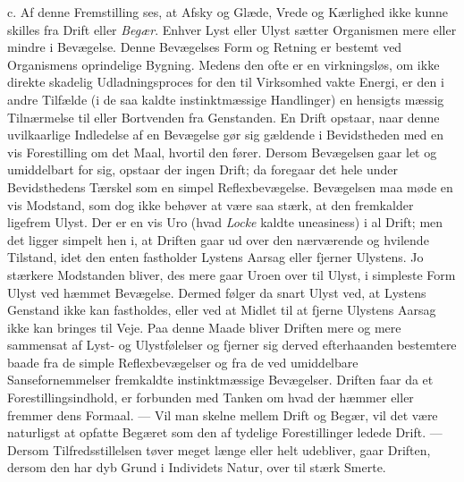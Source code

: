 \documentclass[12pt,a4paper,openany]{book}
\newcommand{\opage}[1]{\marginnote{\footnotesize\textit{[#1]}}}
\begin{document}
c. Af denne Fremstilling ses, at Afsky og Glæde, Vrede og Kærlighed ikke
kunne skilles fra Drift eller \emph{Begær}. Enhver Lyst eller Ulyst
sætter Organismen mere eller mindre i Bevægelse. Denne Bevægelses Form
og Retning er bestemt ved Organismens oprindelige Bygning. Medens den
ofte er en virkningsløs, om ikke direkte skadelig Udladningsproces for
den til Virksomhed vakte Energi, er den i andre Tilfælde (i de saa
kaldte instinktmæssige Handlinger) en hensigts%
\opage{284}mæssig Tilnærmelse til eller Bortvenden fra Genstanden. En
Drift opstaar, naar denne uvilkaarlige Indledelse af en Bevægelse gør
sig gældende i Bevidstheden med en vis Forestilling om det Maal, hvortil
den fører. Dersom Bevægelsen gaar let og umiddelbart for sig, opstaar
der ingen Drift; da foregaar det hele under Bevidsthedens Tærskel som en
simpel Reflexbevægelse. Bevægelsen maa møde en vis Modstand, som dog
ikke behøver at være saa stærk, at den fremkalder ligefrem Ulyst. Der er
en vis Uro (hvad \emph{Locke} kaldte uneasiness) i al Drift; men det
ligger simpelt hen i, at Driften gaar ud over den nærværende og hvilende
Tilstand, idet den enten fastholder Lystens Aarsag eller fjerner
Ulystens. Jo stærkere Modstanden bliver, des mere gaar Uroen over til
Ulyst, i simpleste Form Ulyst ved hæmmet Bevægelse. Dermed følger da
snart Ulyst ved, at Lystens Genstand ikke kan fastholdes, eller ved at
Midlet til at fjerne Ulystens Aarsag ikke kan bringes til Veje. Paa
denne Maade bliver Driften mere og mere sammensat af Lyst- og
Ulystfølelser og fjerner sig derved efterhaanden bestemtere baade fra de
simple Reflexbevægelser og fra de ved umiddelbare Sansefornemmelser
fremkaldte instinktmæssige Bevægelser. Driften faar da et
Forestillingsindhold, er forbunden med Tanken om hvad der hæmmer eller
fremmer dens Formaal. --- Vil man skelne mellem Drift og Begær, vil det
være naturligst at opfatte Begæret som den af tydelige Forestillinger
ledede Drift. --- Dersom Tilfredsstillelsen tøver meget længe eller helt
udebliver, gaar Driften, dersom den har dyb Grund i Individets Natur,
over til stærk Smerte.
\end{document}
